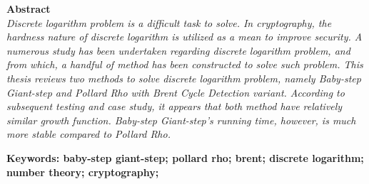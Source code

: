 \noindent\textbf{Abstract} \\
\itshape
Discrete logarithm problem is a difficult task to solve. In cryptography, the hardness nature of discrete logarithm is utilized as a mean to improve security. A numerous study has been undertaken regarding discrete logarithm problem, and from which, a handful of method has been constructed to solve such problem. This thesis reviews two methods to solve discrete logarithm problem, namely Baby-step Giant-step and Pollard Rho with Brent Cycle Detection variant. According to subsequent testing and case study, it appears that both method have relatively similar growth function. Baby-step Giant-step's running time, however, is much more stable compared to Pollard Rho.

\vspace*{1em}
\noindent\bfseries Keywords: baby-step giant-step; pollard rho; brent; discrete logarithm; number theory; cryptography;
\normalfont
\cleardoublepage